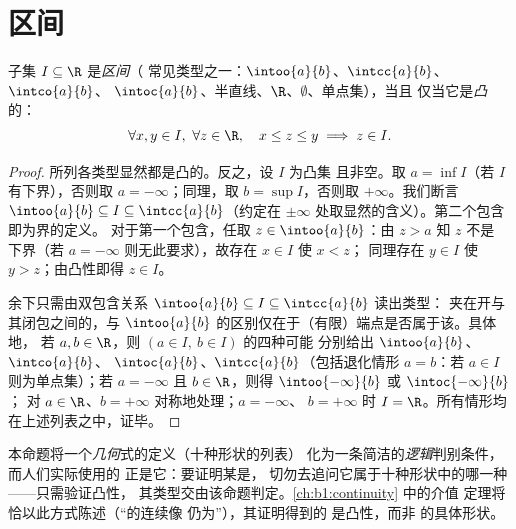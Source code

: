 \section{区间}

\begin{proposition}[区间的刻画]\label{prop:b1:reals:intervals}
子集 $I \subseteq \R$ 是\emph{区间}（
常见类型之一：$\intoo{a}{b}$、$\intcc{a}{b}$、$\intco{a}{b}$、
$\intoc{a}{b}$、半直线、$\R$、$\emptyset$、单点集），当且
仅当它是\emph{凸}的：
\[
\forall x, y \in I,\ \forall z \in \R, \quad
x \leq z \leq y \implies z \in I .
\]
\end{proposition}

\begin{proof}
所列各类型显然都是凸的。反之，设 $I$ 为凸集
且非空。取 $a = \inf I$（若 $I$ 有下界），否则取 $a =
-\infty$；同理，取 $b = \sup I$，否则取 $+\infty$。我们断言 $\intoo{a}{b}
\subseteq I \subseteq \intcc{a}{b}$（约定在
$\pm\infty$ 处取显然的含义）。第二个包含即为界的定义。
对于第一个包含，任取 $z \in \intoo{a}{b}$：由 $z > a$ 知 $z$ 不是
下界（若 $a = -\infty$ 则无此要求），故存在 $x \in I$ 使 $x < z$；
同理存在 $y \in I$ 使 $y > z$；由凸性即得 $z \in I$。

余下只需由双包含关系
$\intoo{a}{b} \subseteq I \subseteq \intcc{a}{b}$ 读出类型：
夹在开与其闭包之间的，与
$\intoo{a}{b}$ 的区别仅在于（有限）端点是否属于该。具体地，
若 $a, b \in \R$，则 $(a \in I,\ b \in I)$ 的四种可能
分别给出 $\intoo{a}{b}$、$\intco{a}{b}$、
$\intoc{a}{b}$、$\intcc{a}{b}$（包括退化情形
$a = b$：若 $a \in I$ 则为单点集）；若 $a = -\infty$ 且 $b \in
\R$，则得 $\intoo{-\infty}{b}$ 或 $\intoc{-\infty}{b}$；
对 $a \in \R$、$b = +\infty$ 对称地处理；$a = -\infty$、
$b = +\infty$ 时 $I = \R$。所有情形均在上述列表之中，证毕。
\end{proof}

\begin{remark}[为何凸性是正确的判别准则]
本命题将一个\emph{几何}式的定义（十种形状的列表）
化为一条简洁的\emph{逻辑}判别条件，而人们实际使用的
正是它：要证明某是，
切勿去追问它属于十种形状中的哪一种——只需验证凸性，
其类型交由该命题判定。\cref{ch:b1:continuity} 中的介值
定理将恰以此方式陈述（“的连续像
仍为”），其证明得到的
是凸性，而非
的具体形状。
\end{remark}

